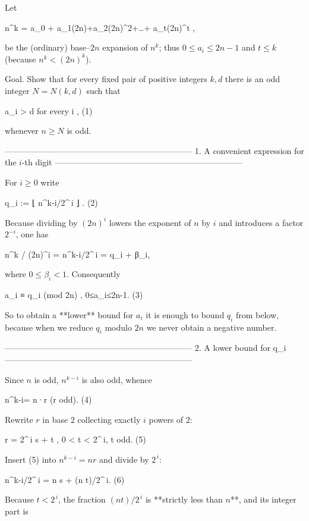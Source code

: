 Let  

                     n^k = a_0 + a_1(2n)+a_2(2n)^2+\dots + a_t(2n)^t ,
   
be the (ordinary) base–$2n$ expansion of $n^{k}$;  
thus $0\le a_i\le 2n-1$ and $t\le k$ (because $n^{k}<(2n)^k$).

Goal.  Show that for every fixed pair of positive integers $k,d$ there is
an odd integer $N=N(k,d)$ such that 

                       a_i > d   for every i ,         (1)

whenever $n\ge N$ is odd.

--------------------------------------------------------------------
1.  A convenient expression for the $i$-th digit
--------------------------------------------------------------------

For $i\ge 0$ write

                 q_i := ⌊ n^{k-i}/2^{\,i} ⌋ .                       (2)

Because dividing by $(2n)^i$ lowers the exponent of $n$ by $i$ and
introduces a factor $2^{-i}$, one has  

                 n^{k} / (2n)^i = n^{k-i}/2^{\,i} = q_i + β_i,
                 
where $0\le β_i<1$.  Consequently  

                 a_i ≡ q_i  (mod 2n) ,              0≤a_i≤2n-1.     (3)

So to obtain a **lower** bound for $a_i$ it is enough to bound $q_i$
from below, because when we reduce $q_i$ modulo $2n$ we never obtain a
negative number.

--------------------------------------------------------------------
2.  A lower bound for q_i
--------------------------------------------------------------------

Since $n$ is odd, $n^{k-i}$ is also odd, whence  

                 n^{k-i}= n·r                         (r odd).      (4)

Rewrite $r$ in base $2$ collecting exactly $i$ powers of $2$:

                 r = 2^{\,i} s + t ,           0 < t < 2^{\,i},  t odd.  (5)

Insert (5) into $n^{k-i}=n r$ and divide by $2^{\,i}$:

     n^{k-i}/2^{\,i} = n s + (n t)/2^{\,i}.                       (6)

Because $t<2^{\,i}$, the fraction $(n t)/2^{\,i}$ is **strictly less
than $n$**, and its integer part is

